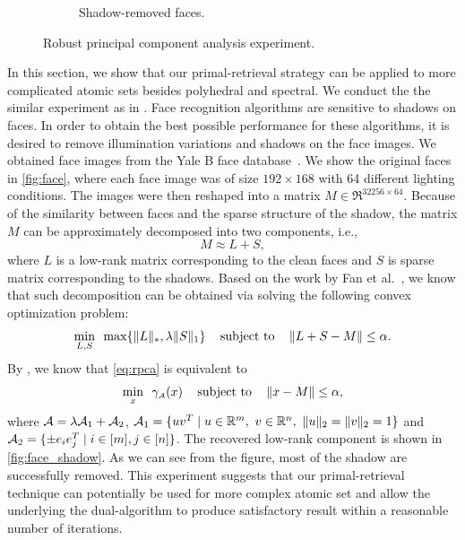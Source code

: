 \begin{figure}[t]
\begin{subfigure}{.45\textwidth}
      \captionsetup{justification=centering}
      \caption{Shadow-removed faces.}
      \label{fig:face_shadow}
    \end{subfigure}
    \captionsetup{justification=centering}
    \caption{Robust principal component analysis experiment.}
\end{figure}

In this section, we show that our primal-retrieval strategy can be applied to more complicated atomic sets besides polyhedral and spectral. We conduct the the similar experiment as in \cite{candes2011robust}. Face recognition algorithms are sensitive to shadows on faces. In order to obtain the best possible performance for these algorithms, it is desired to remove illumination variations and shadows on the face images. We obtained face images from the Yale B face database~\cite{georghiades2001few}. We show the original faces in \autoref{fig:face}, where each face image was of size $192\times 168$ with 64 different lighting conditions. The images were then reshaped into a matrix $M \in \Re^{32256 \times 64}$. Because of the similarity between faces and the sparse structure of the shadow, the matrix $M$ can be approximately decomposed into two components, i.e., 
\[M \approx L + S,\]
where $L$ is a low-rank matrix corresponding to the clean faces and $S$ is sparse matrix corresponding to the shadows. Based on the work by Fan et al.~\cite{fan2020polar}, we know that such decomposition can be obtained via solving the following convex optimization problem:
\begin{equation} \label{eq:rpca}
    \min_{L, S} \enspace \max\{\|L\|_*, \lambda \|S\|_1\}  \enspace \enspace\mathop{\hbox{\rm subject to}}\enspace  \enspace  \|L + S - M\| \leq \alpha.
\end{equation}
By \cite[Proposition~7.3]{fan2019alignment}, we know that \eqref{eq:rpca} is equivalent to 
\begin{equation} \label{eq:rpca2}
    \min_{x} \enspace \gamma_{\scriptscriptstyle\mathcal{A}}(x)  \enspace \enspace\mathop{\hbox{\rm subject to}}\enspace  \enspace  \|x - M\| \leq \alpha,
\end{equation}
where $\mathcal{A} = \lambda \mathcal{A}_1 + \mathcal{A}_2$, $\mathcal{A}_1 = \{uv^T \mid u \in \mathbb{R}^m,\ v \in \mathbb{R}^n,\ \|u\|_2=\|v\|_2 = 1\}$ and $\mathcal{A}_2 = \{\pm e_ie_j^T \mid i \in [m], j \in [n]\}$. The recovered low-rank component is shown in \autoref{fig:face_shadow}. As we can see from the figure, most of the shadow are successfully removed. This experiment suggests that our primal-retrieval technique can potentially be used for more complex atomic set and allow the underlying the dual-algorithm to produce satisfactory result within a reasonable number of iterations. 





